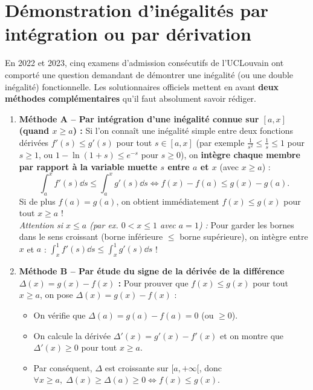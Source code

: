 \section{Démonstration d'inégalités par intégration ou par dérivation}

En 2022 et 2023, cinq examens d'admission consécutifs de l'UCLouvain ont comporté une question demandant de démontrer une inégalité (ou une double inégalité) fonctionnelle. Les solutionnaires officiels mettent en avant \textbf{deux méthodes complémentaires} qu'il faut absolument savoir rédiger.

\begin{theoreme}
\begin{enumerate}
    \item \textbf{Méthode A -- Par intégration d'une inégalité connue sur $[a, x]$ (quand $x \ge a$) :}
    Si l'on connaît une inégalité simple entre deux fonctions dérivées $f'(s) \le g'(s)$ pour tout $s \in [a, x]$ (par exemple $\frac{1}{s^2} \le \frac{1}{s} \le 1$ pour $s \ge 1$, ou $1 - \ln(1+s) \le e^{-s}$ pour $s \ge 0$), on \textbf{intègre chaque membre par rapport à la variable muette $s$ entre $a$ et $x$} (avec $x \ge a$) :
    \[
        \int_a^x f'(s)\dd s \le \int_a^x g'(s)\dd s \iff f(x) - f(a) \le g(x) - g(a).
    \]
    Si de plus $f(a) = g(a)$, on obtient immédiatement $\boxed{f(x) \le g(x)}$ pour tout $x \ge a$ !\\
    \emph{Attention si $x \le a$ (par ex. $0 < x \le 1$ avec $a = 1$) :} Pour garder les bornes dans le sens croissant (borne inférieure $\le$ borne supérieure), on intègre entre $x$ et $a$ : $\int_x^1 f'(s)\dd s \le \int_x^1 g'(s)\dd s$ !
    \item \textbf{Méthode B -- Par étude du signe de la dérivée de la différence $\Delta(x) = g(x) - f(x)$ :}
    Pour prouver que $f(x) \le g(x)$ pour tout $x \ge a$, on pose $\Delta(x) = g(x) - f(x)$ :
    \begin{itemize}
        \item On vérifie que $\Delta(a) = g(a) - f(a) = 0$ (ou $\ge 0$).
        \item On calcule la dérivée $\Delta'(x) = g'(x) - f'(x)$ et on montre que $\Delta'(x) \ge 0$ pour tout $x \ge a$.
        \item Par conséquent, $\Delta$ est croissante sur $[a, +\infty[$, donc $\forall x \ge a,\; \Delta(x) \ge \Delta(a) \ge 0 \iff f(x) \le g(x)$.
    \end{itemize}
\end{enumerate}
\end{theoreme}

